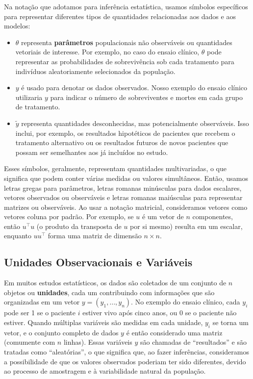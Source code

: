 Na notação que adotamos para inferência estatística, usamos símbolos específicos para representar diferentes tipos de quantidades relacionadas aos dados e aos modelos:
\begin{itemize}[noitemsep]
\item $ \theta $ representa \textbf{parâmetros} populacionais não observáveis ou quantidades vetoriais de interesse. Por exemplo, no caso do ensaio clínico, $ \theta $ pode representar as probabilidades de sobrevivência sob cada tratamento para indivíduos aleatoriamente selecionados da população.
\item  $ y $ é usado para denotar os dados observados. Nosso exemplo do ensaio clínico utilizaria $ y $ para indicar o número de sobreviventes e mortes em cada grupo de tratamento.
\item $ \tilde{y} $ representa quantidades desconhecidas, mas potencialmente observáveis. Isso inclui, por exemplo, os resultados hipotéticos de pacientes que recebem o tratamento alternativo ou os resultados futuros de novos pacientes que possam ser semelhantes aos já incluídos no estudo.
\end{itemize}
Esses símbolos, geralmente, representam quantidades multivariadas, o que significa que podem conter várias medidas ou valores simultâneos. Então, usamos letras gregas para parâmetros, letras romanas minúsculas para dados escalares, vetores observados ou observáveis e letras romanas maiúsculas para representar matrizes ou observáveis. Ao usar a notação matricial, consideramos vetores como vetores coluna por padrão. Por exemplo, se $ u $ é um vetor de $ n $ componentes, então $ u^\top u $ (o produto da transposta de $ u $ por si mesmo) resulta em um escalar, enquanto $ uu^\top $ forma uma matriz de dimensão $ n \times n $.

\subsection{Unidades Observacionais e Variáveis}

Em muitos estudos estatísticos, os dados são coletados de um conjunto de $n$ objetos ou \textbf{unidades}, cada um contribuindo com informações que são organizadas em um vetor $ y = (y_1, \ldots, y_n) $. No exemplo do ensaio clínico, cada $ y_i $ pode ser 1 se o paciente $ i $ estiver vivo após cinco anos, ou 0 se o paciente não estiver. Quando múltiplas variáveis são medidas em cada unidade, $ y_i $ se torna um vetor, e o conjunto completo de dados $ y $ é então considerado uma matriz (comumente com $ n $ linhas). Essas variáveis $ y $ são chamadas de ``resultados'' e são tratadas como ``aleatórias'', o que significa que, ao fazer inferências, consideramos a possibilidade de que os valores observados poderiam ter sido diferentes, devido ao processo de amostragem e à variabilidade natural da população.

